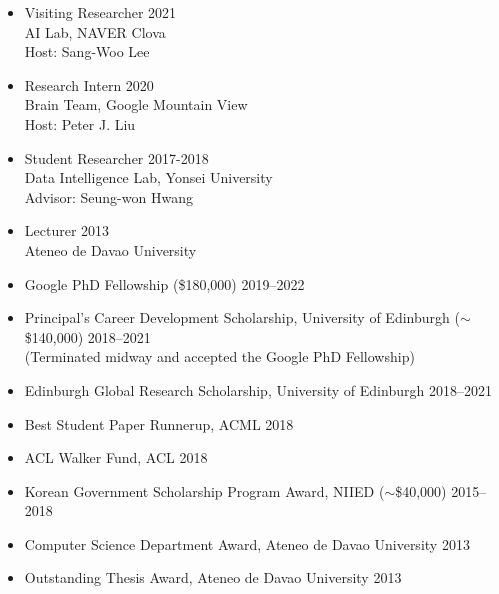 \documentclass[11pt]{article}
\renewcommand{\section}[1]
{\vspace{1.0\baselineskip}{\Large\textbf{#1}}}
\begin{document}
\begin{itemize}[leftmargin=12pt]
  \item[] Visiting Researcher \hfill 2021 \\
  AI Lab, NAVER Clova \\
  Host: Sang-Woo Lee
  
  \item[] Research Intern \hfill 2020 \\
  Brain Team, Google Mountain View \\
  Host: Peter J. Liu
  
  \item[] Student Researcher \hfill 2017-2018 \\
  Data Intelligence Lab, Yonsei University \\
  Advisor: Seung-won Hwang
  
  \item[] Lecturer \hfill 2013 \\
  Ateneo de Davao University
\end{itemize}

\section{Awards}

\begin{itemize}[leftmargin=12pt]
  \item[] Google PhD Fellowship 
  {\small (\$180,000)}
  \hfill 2019--2022
  
  \item[] Principal’s Career Development Scholarship, University of Edinburgh 
  {\small ($\sim$\$140,000)}
  \hfill 2018--2021\\
  {\footnotesize (Terminated midway and accepted the Google PhD Fellowship)}
  
  \item[] Edinburgh Global Research Scholarship, University of Edinburgh \hfill 2018--2021
  
  \item[] Best Student Paper Runnerup, ACML \hfill 2018
  
  \item[] ACL Walker Fund, ACL \hfill 2018
  
  \item[] Korean Government Scholarship Program Award, NIIED 
  {\small ($\sim$\$40,000)} 
  \hfill 2015--2018
  
  \item[] Computer Science Department Award, Ateneo de Davao University \hfill 2013
  
  \item[] Outstanding Thesis Award, Ateneo de Davao University \hfill 2013
\end{itemize}
\end{document}
